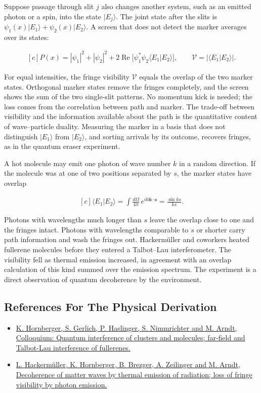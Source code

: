 \documentclass[11pt,oneside]{book}
\newenvironment{centeredalign}{\[\begin{gathered}[c]}{\end{gathered}\]}
\newcommand{\ket}[1]{\lvert #1\rangle}
\begin{document}
Suppose passage through slit \(j\) also changes another system, such as an emitted photon or a spin, into the state \(\ket{E_j}\). The joint state after the slits is \(\psi_1(x)\ket{E_1}+\psi_2(x)\ket{E_2}\). A screen that does not detect the marker averages over its states:

\begin{centeredalign}
P(x)=|\psi_1|^2+|\psi_2|^2+2\operatorname{Re}\big[\psi_1^*\psi_2\langle E_1|E_2\rangle\big],
\qquad \mathcal V=|\langle E_1|E_2\rangle|.
\end{centeredalign}

For equal intensities, the fringe visibility \(\mathcal V\) equals the overlap of the two marker states. Orthogonal marker states remove the fringes completely, and the screen shows the sum of the two single-slit patterns. No momentum kick is needed; the loss comes from the correlation between path and marker. The trade-off between visibility and the information available about the path is the quantitative content of wave--particle duality. Measuring the marker in a basis that does not distinguish \(\ket{E_1}\) from \(\ket{E_2}\), and sorting arrivals by its outcome, recovers fringes, as in the quantum eraser experiment.

A hot molecule may emit one photon of wave number \(k\) in a random direction. If the molecule was at one of two positions separated by \(s\), the marker states have overlap

\begin{centeredalign}
\langle E_1|E_2\rangle=\int\frac{d\Omega}{4\pi}\,e^{ik\hat{\mathbf n}\cdot\mathbf s}=\frac{\sin ks}{ks}.
\end{centeredalign}

Photons with wavelengths much longer than \(s\) leave the overlap close to one and the fringes intact. Photons with wavelengths comparable to \(s\) or shorter carry path information and wash the fringes out. Hackermüller and coworkers heated fullerene molecules before they entered a Talbot--Lau interferometer. The visibility fell as thermal emission increased, in agreement with an overlap calculation of this kind summed over the emission spectrum. The experiment is a direct observation of quantum decoherence by the environment.

\subsection*{References For The Physical Derivation}
\begin{itemize}
\item \href{https://arxiv.org/abs/1109.5937}{K. Hornberger, S. Gerlich, P. Haslinger, S. Nimmrichter and M. Arndt, Colloquium: Quantum interference of clusters and molecules; far-field and Talbot-Lau interference of fullerenes.}
\item \href{https://arxiv.org/abs/quant-ph/0402146}{L. Hackermüller, K. Hornberger, B. Brezger, A. Zeilinger and M. Arndt, Decoherence of matter waves by thermal emission of radiation; loss of fringe visibility by photon emission.}
\end{itemize}
\end{document}
